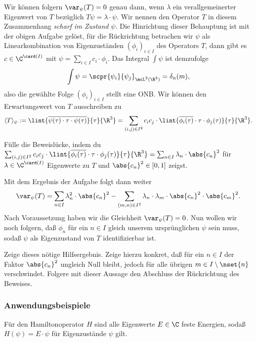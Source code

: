 \documentclass{subfiles}
\begin{document}
    Wir können folgern $\var_\psi(T) = 0$ genau dann, wenn $\lambda$ ein verallgemeinerter Eigenwert von $T$ bezüglich $T\psi = \lambda\cdot\psi$. Wir nennen den Operator $T$ in diesem Zusammenhang \emph{scharf im Zustand $\psi$}. Die Hinrichtung dieser Behauptung ist mit der obigen Aufgabe gelöst, für die Rückrichtung betrachen wir $\psi$ als Linearkombination von Eigenzuständen $(\phi_i)_{i\in I}$ des Operators $T$, dann gibt es $c\in\C^{\card(I)}$ mit $\psi = \sum_{i\in I}c_i\cdot\phi_i$. Das Integral $\int\psi$ ist demzufolge
    \[\int\psi = \scpr{\psi_i}{\psi_j}_{\mcL^2(\R^3)} = \delta_{n}(m),\]
    also die gewählte Folge $(\phi_i)_{i\in I}$ stellt eine ONB. Wir können den Erwartungswert von $T$ ausschreiben zu 
    \[\langle T\rangle_\psi := \lint{\overline{\psi(\tau)\cdot\tau\cdot\psi(\tau)}}{\tau}{\R^3} = \sum_{(i,j)\in I^2}c_ic_j\cdot\lint{\overline{\phi_i(\tau)}\cdot\tau\cdot\phi_j(\tau)}{\tau}{\R^3}.\]
    \begin{Aufgabe}
        \nr{} Fülle die Beweislücke, indem du $\sum_{(i,j)\in I^2}c_ic_j\cdot\lint{\overline{\phi_i(\tau)}\cdot\tau\cdot\phi_j(\tau)}{\tau}{\R^3} = \sum_{n\in I}\lambda_n\cdot\abs{c_n}^2$ für $\lambda\in\C^{\card(I)}$ Eigenwerte zu $T$ und $\abs{c_n}^2\in[0,1]$ zeigst. 
    \end{Aufgabe}
    Mit dem Ergebnis der Aufgabe folgt dann weiter
    \[\var_\psi(T) = \sum_{n\in I}\lambda_n^2\cdot\abs{c_n}^2 - \sum_{(m,n)\in I^2}\lambda_n\cdot\lambda_m\cdot\abs{c_n}^2\cdot\abs{c_m}^2.\]
    Nach Voraussetzung haben wir die Gleichheit $\var_\psi(T) = 0$. Nun wollen wir noch folgern, daß $\phi_n$ für ein $n\in I$ gleich unserem ursprünglichen $\psi$ sein muss, sodaß $\psi$ als Eigenzustand von $T$ identifizierbar ist. 
    \begin{Aufgabe}
        \nr{} Zeige dieses nötige Hilfsergebnis. Zeige hierzu konkret, daß für ein $n\in I$ der Faktor $\abs{c_n}^2$ ungleich Null bleibt, jedoch für alle übrigen $m\in I\setminus\nset{n}$ verschwindet. Folgere mit dieser Aussage den Abschluss der Rückrichtung des Beweises.
    \end{Aufgabe}

    \subsubsection*{Anwendungsbeispiele}
        Für den Hamiltonoperator $H$ sind alle Eigenwerte $E\in\C$ feste Energien, sodaß $H(\psi)=E\cdot\psi$ für Eigenzustände $\psi$ gilt. \\
\end{document}
